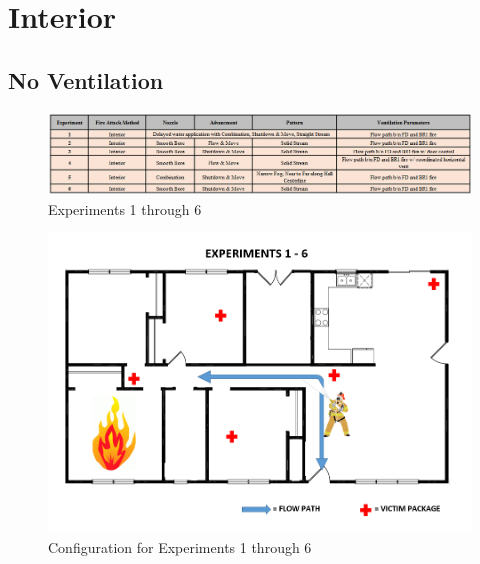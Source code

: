 \documentclass[12pt,oneside]{book}
\begin{document}
\section{Interior}
\subsection{No Ventilation}

\begin{figure}[H]
	\centering
	\includegraphics[width=7in]{Figures/General/Exp1to6.png}
	\caption{Experiments 1 through 6}
	\label{fig:Exp1to6}
\end{figure}


\begin{figure}[H]
	\centering
	\includegraphics[width=5in]{Figures/General/Exps1through6.png}
	\caption{Configuration for Experiments 1 through 6}
	\label{fig:ExpConfig1to6}
\end{figure}
\end{document}
